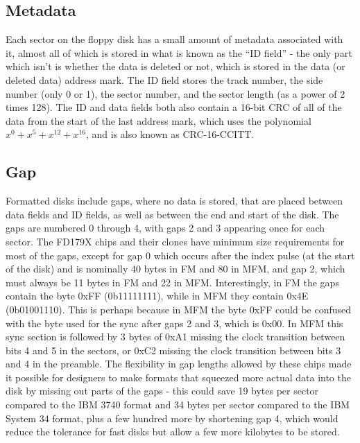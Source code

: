 \documentclass[a4paper]{article}
\begin{document}
\subsection{Metadata}

Each sector on the floppy disk has a small amount of metadata
associated with it, almost all of which is stored in what is known as
the ``ID field'' - the only part which isn't is whether the data is
deleted or not, which is stored in the data (or deleted data) address
mark. The ID field stores the track number, the side number (only 0 or
1), the sector number, and the sector length (as a power of 2 times
128). The ID and data fields both also contain a 16-bit CRC of all of
the data from the start of the last address mark, which uses the
polynomial \(x^0 + x^5 + x^{12} + x^{16}\), and is also known as
CRC-16-CCITT.

\subsection{Gap}

Formatted disks include gaps, where no data is stored, that are placed
between data fields and ID fields, as well as between the end and
start of the disk. The gaps are numbered 0 through 4, with gaps 2 and
3 appearing once for each sector. The FD179X chips and their clones
have minimum size requirements for most of the gaps, except for gap 0
which occurs after the index pulse (at the start of the disk) and is
nominally 40 bytes in FM and 80 in MFM, and gap 2, which must always
be 11 bytes in FM and 22 in MFM. Interestingly, in FM the gaps contain
the byte 0xFF (0b11111111), while in MFM they contain 0x4E
(0b01001110). This is perhaps because in MFM the byte 0xFF could be
confused with the byte used for the sync after gaps 2 and 3, which is
0x00. In MFM this sync section is followed by 3 bytes of 0xA1 missing
the clock transition between bits 4 and 5 in the sectors, or 0xC2
missing the clock transition between bits 3 and 4 in the preamble. The
flexibility in gap lengths allowed by these chips made it possible for
designers to make formats that squeezed more actual data into the disk
by missing out parts of the gaps - this could save 19 bytes per sector
compared to the IBM 3740 format and 34 bytes per sector compared to
the IBM System 34 format, plus a few hundred more by shortening gap 4,
which would reduce the tolerance for fast disks but allow a few more
kilobytes to be stored.
\end{document}
